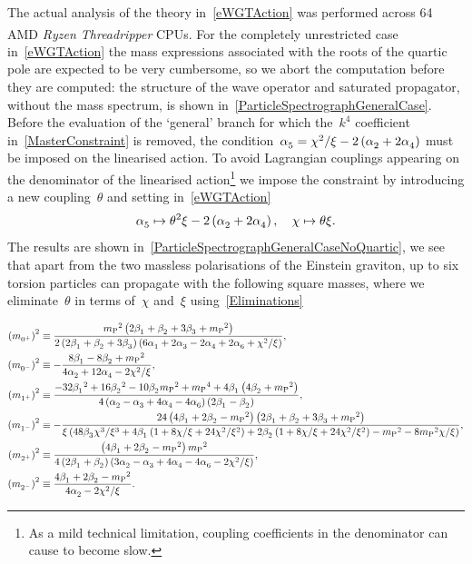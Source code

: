 \documentclass[aps,prd,reprint,preprintnumbers,showpacs,floatfix,nofootinbib,superscript address]{revtex4-2}
\begin{document}
The actual analysis of the theory in~\cref{eWGTAction} was performed across 64 AMD\textsuperscript{\textregistered} \emph{Ryzen Threadripper} CPUs. For the completely unrestricted case in~\cref{eWGTAction} the mass expressions associated with the roots of the quartic pole are expected to be very cumbersome, so we abort the computation before they are computed: the structure of the wave operator and saturated propagator, without the mass spectrum, is shown in~\cref{ParticleSpectrographGeneralCase}. Before the evaluation of the `general' branch for which the~$k^4$ coefficient in~\cref{MasterConstraint} is removed, the condition~$\Alp{5}=\chi^2/\xi-2\left(\Alp{2}+2\Alp{4}\right)$ must be imposed on the linearised action. To avoid Lagrangian couplings appearing on the denominator of the linearised action\footnote{As a mild technical limitation, coupling coefficients in the denominator can cause \PSALTer{} to become slow.} we impose the constraint by introducing a new coupling~$\theta$ and setting in~\cref{eWGTAction}
\begin{equation}\label{Eliminations}
	\Alp{5}\mapsto\theta^2\xi-2\left(\Alp{2}+2\Alp{4}\right), \quad \chi\mapsto\theta\xi.
\end{equation}
The results are shown in~\cref{ParticleSpectrographGeneralCaseNoQuartic}, we see that apart from the two massless polarisations of the Einstein graviton, up to six torsion particles can propagate with the following square masses, where we eliminate~$\theta$ in terms of~$\chi$ and~$\xi$ using~\cref{Eliminations}
\begin{widetext}
\begin{subequations}
\begin{align}
	\MassSquared{0^+}&\equiv\frac{\MPl{}^2\left(2\Bet{1}+\Bet{2}+3\Bet{3}+\MPl{}^2\right)}{2\left(2\Bet{1}+\Bet{2}+3\Bet{3}\right)\left(6\Alp{1}+2\Alp{3}-2\Alp{4}+2\Alp{6}+\chi^2/\xi\right)},\label{Mass0p}\\
	\MassSquared{0^-}&\equiv-\frac{8\Bet{1}-8\Bet{2}+\MPl{}^2}{4\Alp{2}+12\Alp{4}-2\chi^2/\xi},\label{Mass0m}\\
	\MassSquared{1^+}&\equiv\frac{-32\Bet{1}^2+16\Bet{2}^2-10\Bet{2}\MPl{}^2+\MPl{}^4+4\Bet{1}\left(4\Bet{2}+\MPl{}^2\right)}{4\left(\Alp{2}-\Alp{3}+4\Alp{4}-4\Alp{6}\right)\left(2\Bet{1}-\Bet{2}\right)} ,\label{Mass1p}\\
	\MassSquared{1^-}&\equiv-\frac{24\left(4\Bet{1}+2\Bet{2}-\MPl{}^2\right)\left(2\Bet{1}+\Bet{2}+3\Bet{3}+\MPl{}^2\right)}{\xi\left(48\Bet{3}\chi^3/\xi^3+4\Bet{1}\left(1+8\chi/\xi+24\chi^2/\xi^2\right)+2\Bet{2}\left(1+8\chi/\xi+24\chi^2/\xi^2\right)-\MPl{}^2-8\MPl{}^2\chi/\xi\right)},\label{Mass1m}\\
	\MassSquared{2^+}&\equiv\frac{\left(4\Bet{1}+2\Bet{2}-\MPl{}^2\right)\MPl{}^2}{4\left(2\Bet{1}+\Bet{2}\right)\left(3\Alp{2}-\Alp{3}+4\Alp{4}-4\Alp{6}-2\chi^2/\xi\right)},\label{Mass2p}\\
	\MassSquared{2^-}&\equiv\frac{4\Bet{1}+2\Bet{2}-\MPl{}^2}{4\Alp{2}-2\chi^2/\xi}.\label{Mass2m}
\end{align}
\end{subequations}
\end{widetext}
\end{document}
